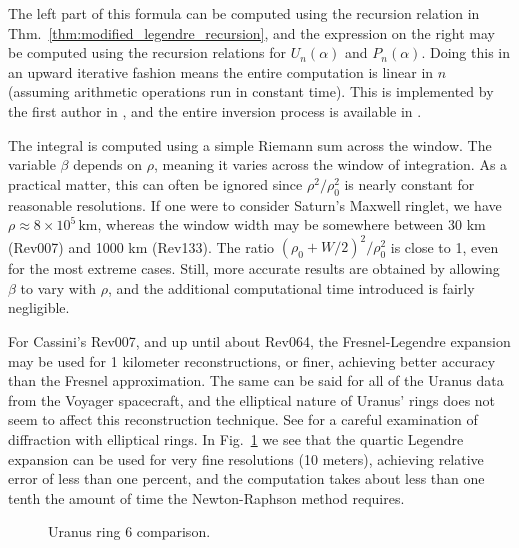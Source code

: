 \documentclass{article}
\theoremstyle{plain}
\begin{document}
        The left part of this formula can be computed using the recursion
        relation in Thm.~\ref{thm:modified_legendre_recursion}, and the
        expression on the right may be computed using the recursion relations
        for $U_{n}(\alpha)$ and $P_{n}(\alpha)$. Doing this in an upward
        iterative fashion means the entire computation is linear in $n$
        (assuming arithmetic operations run in constant time). This is
        implemented by the first author in \cite{MaguireLibtmpl}, and the
        entire inversion process is available in
        \cite{RssRingoccsGithub}.
        \par\hfill\par
        The integral is computed using a simple Riemann sum across the window.
        The variable $\beta$ depends on $\rho$, meaning it varies across the
        window of integration. As a practical matter, this can often be ignored
        since $\rho^{2}/\rho_{0}^{2}$ is nearly constant for reasonable
        resolutions. If one were to consider Saturn's Maxwell ringlet, we have
        $\rho\approx{8}\times{10}^{5}\,\textrm{km}$, whereas the window width
        may be somewhere between 30 km (Rev007) and 1000 km (Rev133).
        The ratio $(\rho_{0}+W/2)^{2}/\rho_{0}^{2}$ is close to 1, even for
        the most extreme cases. Still, more accurate results are obtained by
        allowing $\beta$ to vary with $\rho$, and the additional computational
        time introduced is fairly negligible.
        \par\hfill\par
        For Cassini's Rev007, and up until about Rev064, the Fresnel-Legendre
        expansion may be used for 1 kilometer reconstructions, or finer,
        achieving better accuracy than the Fresnel approximation. The same
        can be said for all of the Uranus data from the Voyager spacecraft,
        and the elliptical nature of Uranus' rings does not seem to affect
        this reconstruction technique. See \cite{GreshVoyager1988}
        for a careful examination of diffraction with elliptical rings.
        In Fig.~\ref{fig:uranus_ring_6_newton_vs_fresnel_vs_legendre} we see
        that the quartic Legendre expansion can be used for very fine
        resolutions (10 meters), achieving relative error of less than one
        percent, and the computation takes about less than one tenth the amount
        of time the Newton-Raphson method requires.
        \begin{figure}
            \centering
            \label{fig:uranus_ring_6_newton_vs_fresnel_vs_legendre}
            \caption{Uranus ring 6 comparison.}
        \end{figure}
\end{document}
